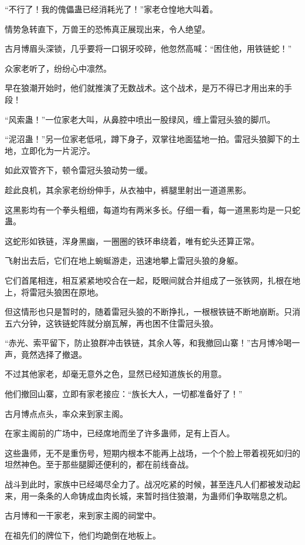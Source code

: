 \begin{this_body}
“不行了！我的傀儡蛊已经消耗光了！”家老仓惶地大叫着。

情势急转直下，万兽王的恐怖真正展现出来，令人绝望。

古月博眉头深锁，几乎要将一口钢牙咬碎，他忽然高喊：“困住他，用铁链蛇！”

众家老听了，纷纷心中凛然。

早在狼潮开始时，他们就推演了无数战术。这个战术，是万不得已才用出来的手段！

“风索蛊！”一位家老大叫，从鼻腔中喷出一股绿风，缠上雷冠头狼的脚爪。

“泥沼蛊！”另一位家老低吼，蹲下身子，双掌往地面猛地一拍。雷冠头狼脚下的土地，立即化为一片泥泞。

如此双管齐下，顿令雷冠头狼动势一缓。

趁此良机，其余家老纷纷伸手，从衣袖中，裤腿里射出一道道黑影。

这黑影均有一个拳头粗细，每道均有两米多长。仔细一看，每一道黑影均是一只蛇蛊。

这蛇形如铁链，浑身黑幽，一圈圈的铁环串绕着，唯有蛇头还算正常。

飞射出去后，它们在地上蜿蜒游走，迅速地攀上雷冠头狼的身躯。

它们首尾相连，相互紧紧地咬合在一起，眨眼间就合并组成了一张铁网，扎根在地上，将雷冠头狼困在原地。

但这情形也只是暂时的，随着雷冠头狼的不断挣扎，一根根铁链不断地崩断。只消五六分钟，这铁链蛇阵就分崩瓦解，再也困不住雷冠头狼。

“赤光、索平留下，防止狼群冲击铁链，其余人等，和我撤回山寨！”古月博冷喝一声，竟然选择了撤退。

不过其他家老，却毫无意外之色，显然已经知道族长的用意。

他们撤回山寨，立即有家老接应：“族长大人，一切都准备好了！”

古月博点点头，率众来到家主阁。

在家主阁前的广场中，已经席地而坐了许多蛊师，足有上百人。

这些蛊师，无不是重伤号，短期内根本不能再上战场，一个个脸上带着视死如归的坦然神色。至于那些腿脚还便利的，都在前线奋战。

战斗到此时，家族中已经竭尽全力了。战况吃紧的时候，甚至连凡人们都被发动起来，用一条条的人命铸成血肉长城，来暂时挡住狼潮，为蛊师们争取喘息之机。

古月博和一干家老，来到家主阁的祠堂中。

在祖先们的牌位下，他们均跪倒在地板上。


\end{this_body}
